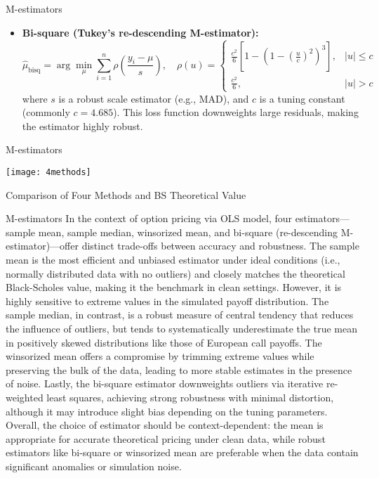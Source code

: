 \documentclass[aspectratio=169,xcolor=dvipsnames]{beamer}
\begin{document}
	\begin{frame}{M-estimators}
		\begin{itemize}
	\item \textbf{Bi-square (Tukey's re-descending M-estimator):}
	\[
	\hat{\mu}_{\text{bisq}} = \arg\min_{\mu} \sum_{i=1}^{n} \rho\left( \frac{y_i - \mu}{s} \right), \quad
	\rho(u) =
	\begin{cases}
		\frac{c^2}{6} \left[ 1 - \left(1 - \left( \frac{u}{c} \right)^2 \right)^3 \right], & |u| \leq c \\
		\frac{c^2}{6}, & |u| > c
	\end{cases}
	\]
	where \( s \) is a robust scale estimator (e.g., MAD), and \( c \) is a tuning constant (commonly \( c = 4.685 \)). This loss function downweights large residuals, making the estimator highly robust.
\end{itemize}

\end{frame}

	 \begin{frame}{M-estimators}
	\begin{center}
		\texttt{[image: 4methods]}
		
		Comparison of Four Methods and BS Theoretical Value
	\end{center}
\end{frame}

\begin{frame}{M-estimators}
In the context of option pricing via OLS model, four estimators—sample mean, sample median, winsorized mean, and bi-square (re-descending M-estimator)—offer distinct trade-offs between accuracy and robustness. The sample mean is the most efficient and unbiased estimator under ideal conditions (i.e., normally distributed data with no outliers) and closely matches the theoretical Black-Scholes value, making it the benchmark in clean settings. However, it is highly sensitive to extreme values in the simulated payoff distribution. The sample median, in contrast, is a robust measure of central tendency that reduces the influence of outliers, but tends to systematically underestimate the true mean in positively skewed distributions like those of European call payoffs. The winsorized mean offers a compromise by trimming extreme values while preserving the bulk of the data, leading to more stable estimates in the presence of noise. Lastly, the bi-square estimator downweights outliers via iterative re-weighted least squares, achieving strong robustness with minimal distortion, although it may introduce slight bias depending on the tuning parameters. Overall, the choice of estimator should be context-dependent: the mean is appropriate for accurate theoretical pricing under clean data, while robust estimators like bi-square or winsorized mean are preferable when the data contain significant anomalies or simulation noise.
\end{frame}
\end{document}
